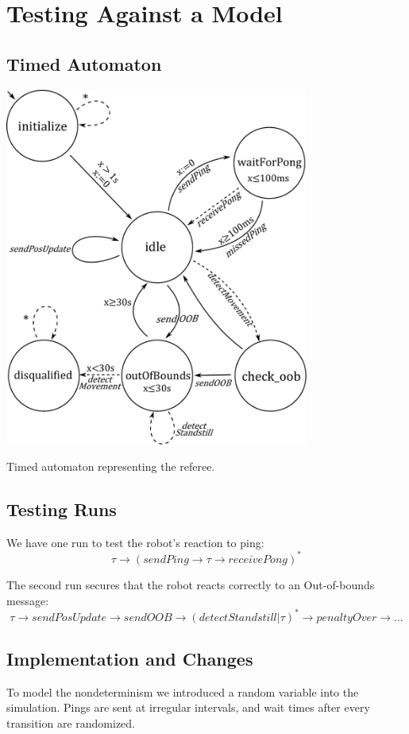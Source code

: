 \documentclass[12pt]{article}
\begin{document}
\section*{Testing Against a Model}

\subsection*{Timed Automaton}
\begin{center}


\includegraphics[width = 0.75\textwidth]{images/ref_ta.pdf}

Timed automaton representing the referee.

\end{center}

\subsection*{Testing Runs}
We have one run to test the robot's reaction to ping:
\[ \tau \rightarrow (sendPing \rightarrow \tau \rightarrow receivePong)^{*}  \] 

\flushleft
The second run secures that the robot reacts correctly to an Out-of-bounds message:
\[ \tau \rightarrow sendPosUpdate\rightarrow sendOOB \rightarrow (detectStandstill | \tau )^{*} \rightarrow penaltyOver \rightarrow \dots \]

\subsection*{Implementation and Changes}
To model the nondeterminism we introduced a random variable into the simulation. Pings are sent at irregular intervals, and wait times after every transition are randomized.
\end{document}
